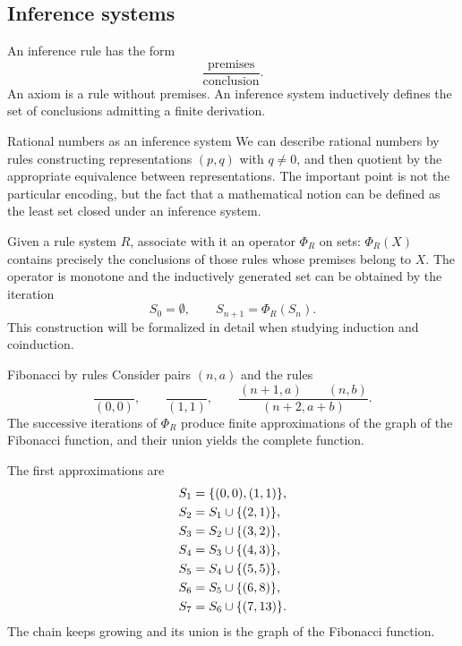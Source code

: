 \documentclass[a4paper]{article}
\begin{document}
\subsection{Inference systems}

An inference rule has the form
\[
    \frac{\text{premises}}{\text{conclusion}}.
\]
An axiom is a rule without premises.
An inference system inductively defines the set of conclusions admitting a finite derivation.

\begin{snippetexample}{Rational numbers as an inference system}
    We can describe rational numbers by rules constructing representations \((p,q)\) with \(q\neq0\), and then quotient by the appropriate equivalence between representations.
    The important point is not the particular encoding, but the fact that a mathematical notion can be defined as the least set closed under an inference system.
\end{snippetexample}

Given a rule system \(R\), associate with it an operator \(\Phi_R\) on sets: \(\Phi_R(X)\) contains precisely the conclusions of those rules whose premises belong to \(X\).
The operator is monotone and the inductively generated set can be obtained by the iteration
\[
    S_0=\emptyset,
    \qquad
    S_{n+1}=\Phi_R(S_n).
\]
This construction will be formalized in detail when studying induction and coinduction.

\begin{snippetexample}{Fibonacci by rules}
    Consider pairs \((n,a)\) and the rules
    \[
        \frac{}{(0,0)},
        \qquad
        \frac{}{(1,1)},
        \qquad
        \frac{(n+1,a)\qquad(n,b)}{(n+2,a+b)}.
    \]
    The successive iterations of \(\Phi_R\) produce finite approximations of the graph of the Fibonacci function, and their union yields the complete function.
\end{snippetexample}

The first approximations are
\begin{align*}
    S_1&=\{(0,0),(1,1)\},\\
    S_2&=S_1\cup\{(2,1)\},\\
    S_3&=S_2\cup\{(3,2)\},\\
    S_4&=S_3\cup\{(4,3)\},\\
    S_5&=S_4\cup\{(5,5)\},\\
    S_6&=S_5\cup\{(6,8)\},\\
    S_7&=S_6\cup\{(7,13)\}.
\end{align*}
The chain keeps growing and its union is the graph of the Fibonacci function.
\end{document}
